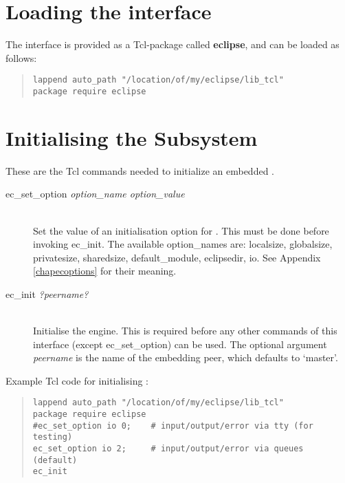 \section{Loading the interface}
The {\eclipse} interface is provided as a Tcl-package called {\bf eclipse},
and can be loaded as follows:
\begin{quote}\begin{verbatim}
lappend auto_path "/location/of/my/eclipse/lib_tcl"
package require eclipse
\end{verbatim}\end{quote}

\section{Initialising the {\eclipse} Subsystem}
These are the Tcl commands needed to initialize an embedded  {\eclipse}.
\begin{description}
\item[ec_set_option {\it option_name option_value}]\ \\
        Set the value of an initialisation option for {\eclipse}.
        This must be done before invoking ec_init.
        The available option_names are:
        localsize, globalsize, privatesize, sharedsize,
        default_module, eclipsedir, io.
	See Appendix \ref{chapecoptions} for their meaning.

\item[ec_init {\it ?peername?}]\ \\
        Initialise the {\eclipse} engine. This is required before any other
        commands of this interface (except ec_set_option) can be used. The
	optional argument {\it peername} is the name of the embedding peer,
        which defaults to `master'.
\end{description}
Example Tcl code for initialising {\eclipse}:
\begin{quote}\begin{verbatim}
lappend auto_path "/location/of/my/eclipse/lib_tcl"
package require eclipse
#ec_set_option io 0;    # input/output/error via tty (for testing)
ec_set_option io 2;     # input/output/error via queues (default)
ec_init
\end{verbatim}\end{quote}


